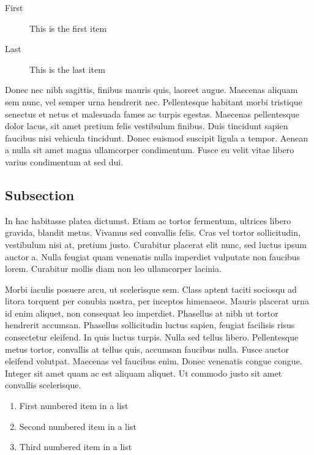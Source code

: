 \documentclass[10pt, a4paper, twocolumn]{article}
\begin{document}
\begin{description}
	\item[First] This is the first item
	\item[Last] This is the last item
\end{description}

Donec nec nibh sagittis, finibus mauris quis, laoreet augue. Maecenas aliquam sem nunc, vel semper urna hendrerit nec. Pellentesque habitant morbi tristique senectus et netus et malesuada fames ac turpis egestas. Maecenas pellentesque dolor lacus, sit amet pretium felis vestibulum finibus. Duis tincidunt sapien faucibus nisi vehicula tincidunt. Donec euismod suscipit ligula a tempor. Aenean a nulla sit amet magna ullamcorper condimentum. Fusce eu velit vitae libero varius condimentum at sed dui.


\subsection{Subsection}

In hac habitasse platea dictumst. Etiam ac tortor fermentum, ultrices libero gravida, blandit metus. Vivamus sed convallis felis. Cras vel tortor sollicitudin, vestibulum nisi at, pretium justo. Curabitur placerat elit nunc, sed luctus ipsum auctor a. Nulla feugiat quam venenatis nulla imperdiet vulputate non faucibus lorem. Curabitur mollis diam non leo ullamcorper lacinia.

Morbi iaculis posuere arcu, ut scelerisque sem. Class aptent taciti sociosqu ad litora torquent per conubia nostra, per inceptos himenaeos. Mauris placerat urna id enim aliquet, non consequat leo imperdiet. Phasellus at nibh ut tortor hendrerit accumsan. Phasellus sollicitudin luctus sapien, feugiat facilisis risus consectetur eleifend. In quis luctus turpis. Nulla sed tellus libero. Pellentesque metus tortor, convallis at tellus quis, accumsan faucibus nulla. Fusce auctor eleifend volutpat. Maecenas vel faucibus enim. Donec venenatis congue congue. Integer sit amet quam ac est aliquam aliquet. Ut commodo justo sit amet convallis scelerisque.

\begin{enumerate}
	\item First numbered item in a list
	\item Second numbered item in a list
	\item Third numbered item in a list
\end{enumerate}
\end{document}
